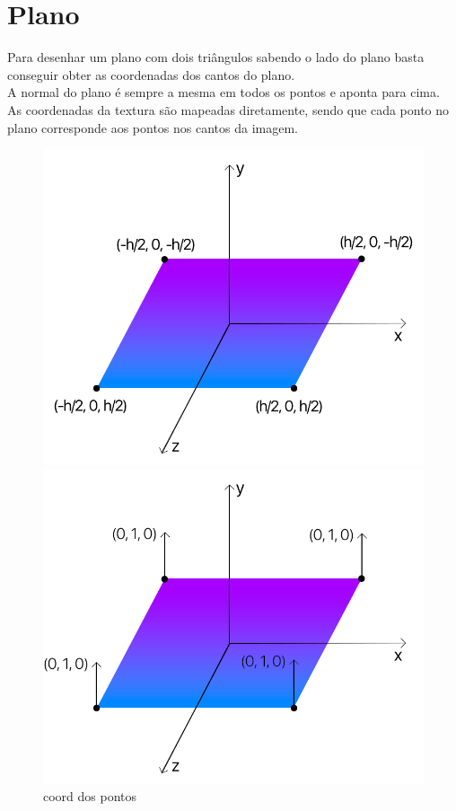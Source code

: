 \documentclass[a4paper]{report}
\begin{document}
\section{Plano}
Para desenhar um plano com dois triângulos sabendo o lado do plano basta
conseguir obter as coordenadas dos cantos do plano.\\
A normal do plano é sempre a mesma em todos os pontos e aponta para cima.\\
As coordenadas da textura são mapeadas diretamente, sendo que cada ponto no
plano corresponde aos pontos nos cantos da imagem.\\
\begin{figure}[H]
    \centering
    \begin{minipage}{0.33\textwidth}
        \centering
        \includegraphics[width=\textwidth]{images/esquema_plano.png}
        \caption{coord dos pontos}
    \end{minipage}\hfill
    \begin{minipage}{0.33\textwidth}
        \centering
        \includegraphics[width=\textwidth]{images/esquema_plano_normais.png}

\end{minipage}
\end{figure}
\end{document}
